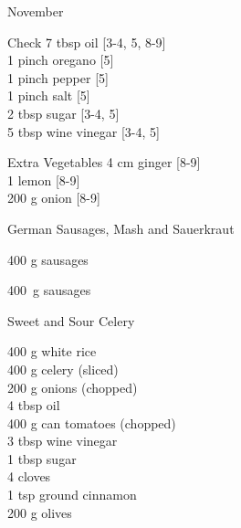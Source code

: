 \begin{menu}{November}
\begin{shoppinglist}{Check}
      7 tbsp oil 
        {\scriptsize[3-4, 5, 8-9]}\\
      1 pinch oregano 
        {\scriptsize[5]}\\
      1 pinch pepper 
        {\scriptsize[5]}\\
      1 pinch salt 
        {\scriptsize[5]}\\
      2 tbsp sugar 
        {\scriptsize[3-4, 5]}\\
      5 tbsp wine vinegar 
        {\scriptsize[3-4, 5]}\\
      \end{shoppinglist}%
      \begin{shoppinglist}{Extra Vegetables}
      4 cm ginger 
        {\scriptsize[8-9]}\\
      1  lemon 
        {\scriptsize[8-9]}\\
      200 g onion 
        {\scriptsize[8-9]}\\
      \end{shoppinglist}%
      \par\vfil %
    \vfil\clearpage
  
    \begin{recipe}{2}{German Sausages, Mash and Sauerkraut}%
    
		\begin{ingredients}
		400 g sausages  \\
	
		\end{ingredients}
	
    \begin{instructions}
    \item 400~g  sausages
    \end{instructions}
    \end{recipe}%
  
    \begin{recipe}{2}{Sweet and Sour Celery}%
    
		\begin{ingredients}
		400 g white rice  \\
	400 g celery (sliced) \\
	200 g onions (chopped) \\
	4 tbsp oil  \\
	400 g can tomatoes (chopped) \\
	3 tbsp wine vinegar  \\
	1 tbsp sugar  \\
	4  cloves  \\
	1 tsp ground cinnamon  \\
	200 g olives  \\
	

\end{ingredients}
\end{recipe}
\end{menu}
